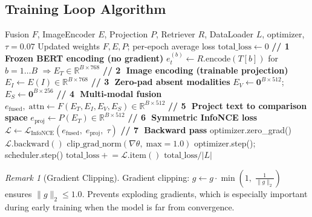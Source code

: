 \documentclass[12pt,a4paper]{article}
\theoremstyle{definition}
\theoremstyle{plain}
\theoremstyle{remark}
\newtheorem{remark}{Remark}[section]
\newcommand{\R}{\mathbb{R}}
\newcommand{\Loss}{\mathcal{L}}
\begin{document}
\subsection{Training Loop Algorithm}

\begin{algorithm}[H]
\caption{Single Training Epoch (train\_epoch)}
\label{alg:trainepoch}
\begin{algorithmic}[1]
\Require Fusion $F$, ImageEncoder $E$, Projection $P$, Retriever $R$,
         DataLoader $L$, optimizer, $\tau = 0.07$
\Ensure Updated weights $F, E, P$; per-epoch average loss
\State $\text{total\_loss} \gets 0$
\ForEach{batch $(I \in \R^{B\times3\times224\times224},\; T) \in L$}
  \State \textbf{// \textcircled{1} Frozen BERT encoding (no gradient)}
  \State $e_t^{(b)} \gets R.\text{encode}(T[b])$ for $b=1\ldots B$ $\Rightarrow E_T \in \R^{B\times768}$
  \State \textbf{// \textcircled{2} Image encoding (trainable projection)}
  \State $E_I \gets E(I) \in \R^{B\times768}$
  \State \textbf{// \textcircled{3} Zero-pad absent modalities}
  \State $E_V \gets \bm{0}^{B\times512}$; $E_S \gets \bm{0}^{B\times256}$
  \State \textbf{// \textcircled{4} Multi-modal fusion}
  \State $e_{\text{fused}},\; \text{attn} \gets F(E_T, E_I, E_V, E_S) \in \R^{B\times512}$
  \State \textbf{// \textcircled{5} Project text to comparison space}
  \State $e_{\text{proj}} \gets P(E_T) \in \R^{B\times512}$
  \State \textbf{// \textcircled{6} Symmetric InfoNCE loss}
  \State $\Loss \gets \Loss_{\text{InfoNCE}}(e_{\text{fused}},\; e_{\text{proj}},\; \tau)$
  \State \textbf{// \textcircled{7} Backward pass}
  \State optimizer.zero\_grad()
  \State $\Loss.\text{backward}()$
  \State $\text{clip\_grad\_norm}(\nabla\theta,\; \text{max}=1.0)$ 
  \State optimizer.step(); scheduler.step()
  \State $\text{total\_loss} \mathrel{+}= \Loss.\text{item}()$
\EndFor
\State \Return $\text{total\_loss} / |L|$
\end{algorithmic}
\end{algorithm}

\begin{remark}[Gradient Clipping]
Gradient clipping: $g \gets g \cdot \min\!\left(1,\; \frac{1}{\|g\|_2}\right)$
ensures $\|g\|_2 \le 1.0$. Prevents exploding gradients, which is especially
important during early training when the model is far from convergence.
\end{remark}

\newpage
\end{document}
